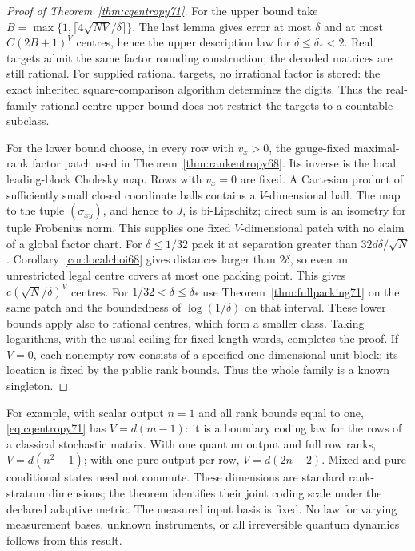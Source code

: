 \begin{proof}[Proof of Theorem~\ref{thm:cqentropy71}]
For the upper bound take
$B=\max\{1,\lceil4\sqrt{NV}/\delta\rceil\}$. The last lemma gives
error at most $\delta$ and at most $C(2B+1)^V$ centres, hence the
upper description law for $\delta\le\delta_*<2$. Real targets admit
the same factor rounding construction; the decoded matrices are still
rational. For supplied rational targets, no irrational factor is stored:
the exact inherited square-comparison algorithm determines the digits.
Thus the real-family rational-centre upper bound does not restrict the
targets to a countable subclass.

For the lower bound choose, in every row with $v_x>0$, the gauge-fixed
maximal-rank factor patch used in Theorem~\ref{thm:rankentropy68}.
Its inverse is the local leading-block Cholesky map. Rows with $v_x=0$
are fixed. A Cartesian product of sufficiently small closed coordinate
balls contains a $V$-dimensional ball. The map to the tuple
$(\sigma_{xy})$, and hence to $J$, is bi-Lipschitz; direct sum is an
isometry for tuple Frobenius norm. This supplies one fixed
$V$-dimensional patch with no claim of a global factor chart.
For $\delta\le1/32$ pack it at separation greater than
$32d\delta/\sqrt N$. Corollary~\ref{cor:localchoi68} gives distances
larger than $2\delta$, so even an unrestricted legal centre covers at
most one packing point. This gives
$c(\sqrt N/\delta)^V$ centres. For $1/32<\delta\le\delta_*$ use
Theorem~\ref{thm:fullpacking71} on the same patch and the boundedness
of $\log(1/\delta)$ on that interval. These lower bounds apply also
to rational centres, which form a smaller class. Taking logarithms,
with the usual ceiling for fixed-length words, completes the proof.
If $V=0$, each nonempty row consists of a specified one-dimensional
unit block; its location is fixed by the public rank bounds. Thus the
whole family is a known singleton.
\end{proof}
For example, with scalar output $n=1$ and all rank bounds equal to
one, \eqref{eq:cqentropy71} has $V=d(m-1)$: it is a boundary coding
law for the rows of a classical stochastic matrix. With one quantum
output and full row ranks, $V=d(n^2-1)$; with one pure output per row,
$V=d(2n-2)$. Mixed and pure conditional states need not commute.
These dimensions are standard rank-stratum dimensions; the theorem
identifies their joint coding scale under the declared adaptive metric.
The measured input basis is fixed. No law for varying measurement bases,
unknown instruments, or all irreversible quantum dynamics follows from
this result.

